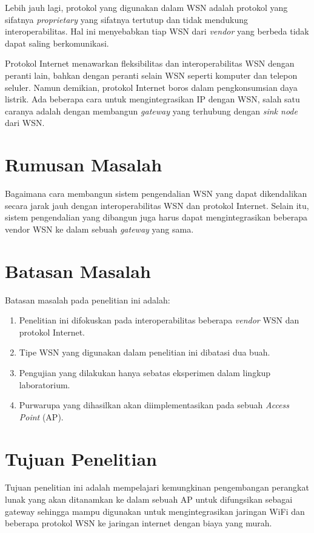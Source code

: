 Lebih jauh lagi, protokol yang digunakan dalam WSN adalah protokol yang sifatnya \emph{proprietary} yang sifatnya tertutup dan tidak mendukung interoperabilitas. Hal ini menyebabkan tiap WSN dari \emph{vendor} yang berbeda tidak dapat saling berkomunikasi.

Protokol Internet menawarkan fleksibilitas dan interoperabilitas WSN dengan peranti lain, bahkan dengan peranti selain WSN seperti komputer dan telepon seluler. Namun demikian, protokol Internet boros dalam pengkonsumsian daya listrik. Ada beberapa cara untuk mengintegrasikan IP dengan WSN, salah satu caranya adalah dengan membangun \emph{gateway} yang terhubung dengan \emph{sink node} dari WSN.


\section{Rumusan Masalah}
Bagaimana cara membangun sistem pengendalian WSN yang dapat dikendalikan secara jarak jauh dengan interoperabilitas WSN dan protokol Internet. Selain itu, sistem pengendalian yang dibangun juga harus dapat mengintegrasikan beberapa vendor WSN ke dalam sebuah \emph{gateway} yang sama.


\section{Batasan Masalah}
Batasan masalah pada penelitian ini adalah:
\begin{enumerate}
\item Penelitian ini difokuskan pada interoperabilitas beberapa \emph{vendor} WSN dan protokol Internet.
\item Tipe WSN yang digunakan dalam penelitian ini dibatasi dua buah.
\item Pengujian yang dilakukan hanya sebatas eksperimen dalam lingkup laboratorium.
\item Purwarupa yang dihasilkan akan diimplementasikan pada sebuah \emph{Access Point} (AP).
\end{enumerate}


\section{Tujuan Penelitian}
Tujuan penelitian ini adalah mempelajari kemungkinan pengembangan perangkat lunak yang akan ditanamkan ke dalam sebuah AP untuk difungsikan sebagai gateway sehingga mampu digunakan untuk mengintegrasikan jaringan WiFi dan beberapa protokol WSN ke jaringan internet dengan biaya yang murah.



